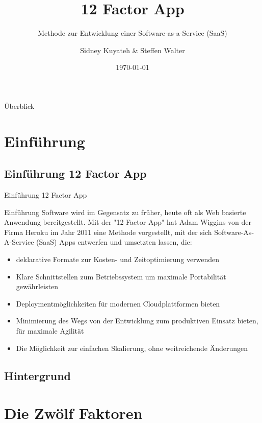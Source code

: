 \documentclass{beamer}
\title{12 Factor App}
\subtitle{Methode zur Entwicklung einer Software-as-a-Service (SaaS)}
\author{Sidney Kuyateh \& Steffen Walter}
\institute{Duale Hochschule Baden-Württemberg}
\date{\today}
\begin{document}
	\maketitle
	\begin{frame}{Überblick}
		\scriptsize
		\setlength{\baselineskip}{7pt}
		\tableofcontents[sectionstyle=show]
	\end{frame}
		\section{Einführung}
			\subsection{Einführung 12 Factor App}
				\begin{frame}{Einführung 12 Factor App}
					\begin{block}{Einführung}
						Software wird im Gegensatz zu früher, heute oft als Web basierte Anwendung bereitgestellt. Mit der "12 Factor App" hat Adam Wiggins von der Firma Heroku im Jahr 2011 eine Methode vorgestellt, mit der sich Software-As-A-Service (SaaS) Apps entwerfen und umsetzten lassen, die:
						\begin{itemize}
							\item deklarative Formate zur Kosten- und Zeitoptimierung verwenden
							\item Klare Schnittstellen zum Betriebssystem um maximale Portabilität gewährleisten
							\item Deploymentmöglichkeiten für modernen Cloudplattformen bieten
							\item Minimierung des Wegs von der Entwicklung zum produktiven Einsatz bieten, für maximale Agilität
							\item Die Möglichkeit zur einfachen Skalierung, ohne weitreichende Änderungen
						\end{itemize}
					\end{block}
				\end{frame}
			\subsection{Hintergrund}
		\section{Die Zwölf Faktoren}
\end{document}
